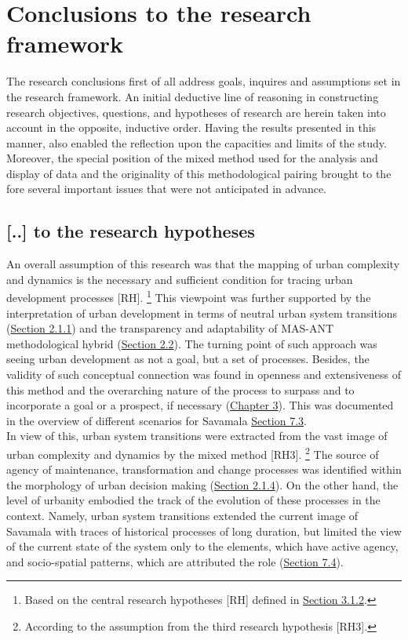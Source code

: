 \documentclass[11pt]{report}
\begin{document}
{{{\section{Conclusions to the research framework}

The research conclusions first of all address goals, inquires and assumptions set in the research framework.
An initial deductive line of reasoning in constructing research objectives, questions, and hypotheses of research are herein taken into account in the opposite, inductive order.
Having the results presented in this manner, also enabled the reflection upon the capacities and limits of the study.
Moreover, the special position of the mixed method used for the analysis and display of data and the originality of this methodological pairing brought to the fore several important issues that were not anticipated in advance.

\subsection{[..] to the research hypotheses}

An overall assumption of this research was that the mapping of urban complexity and dynamics is the necessary and sufficient condition for tracing urban development processes [RH].
\footnote{Based on the central research hypotheses [RH] defined in \href{Section 3.1.2}{Section 3.1.2}.}
This viewpoint was further supported by the interpretation of urban development in terms of neutral urban system transitions (\href{Section 2.1.1}{Section 2.1.1}) and the transparency and adaptability of MAS-ANT methodological hybrid (\href{Section 2.2}{Section 2.2}).
The turning point of such approach was seeing urban development as not a goal, but a set of processes.
Besides, the validity of such conceptual connection was found in openness and extensiveness of this method and the overarching nature of the process to surpass and to incorporate a goal or a prospect, if necessary (\href{Chapter 3}{Chapter 3}).
This was documented in the overview of different scenarios for Savamala \href{Section 7.3}{Section 7.3}.
\\

In view of this, urban system transitions were extracted from the vast image of urban complexity and dynamics by the mixed method [RH3].
\footnote{According to the assumption from the third research hypothesis [RH3].}
The source of agency of maintenance, transformation and change processes was identified within the morphology of urban decision making (\href{Section 2.1.4}{Section 2.1.4}). On the other hand, the level of urbanity embodied the track of the evolution of these processes in the context.
Namely, urban system transitions extended the current image of Savamala with traces of historical processes of long duration, but limited the view of the current state of the system only to the elements, which have active agency, and socio-spatial patterns, which are attributed the role (\href{Section 7.4}{Section 7.4}).
\\

}}}
\end{document}
